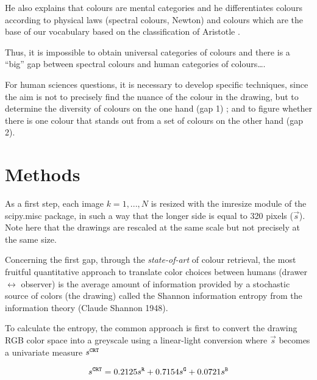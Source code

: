 \documentclass[11pt,a4paper]{article}
\begin{document}
He also explains that colours are mental categories
\cite[][p. 36]{pastoureau2017} and he differentiates colours according
to physical laws (spectral colours, Newton) and colours which are the
base of our vocabulary based on the classification of Aristotle
\cite[][p. 90-91]{pastoureau2017}.

Thus, it is impossible to obtain universal categories of colours and
there is a ``big'' gap between spectral colours and human categories of
colours\ldots{}.

For human sciences questions, it is necessary to develop specific
techniques, since the aim is not to precisely find the nuance of the
colour in the drawing, but to determine the diversity of colours on the
one hand (gap 1) ; and to figure whether there is one colour that stands
out from a set of colours on the other hand (gap 2).


\section{Methods}\label{methods}

As a first step, each image \(k=1,...,N\) is resized with the imresize
module of the scipy.misc package, in such a way that the longer side is
equal to 320 pixels (\(\vec{s}\)). Note here that the drawings are
rescaled at the same scale but not precisely at the same size.


Concerning the first gap, through the \emph{state-of-art} of colour
retrieval, the most fruitful quantitative approach to translate color
choices between humans (drawer \(\leftrightarrow\) observer) is the
average amount of information provided by a stochastic source of colors
(the drawing) called the Shannon information entropy from the
information theory (Claude Shannon 1948).

To calculate the entropy, the common approach is first to convert the
drawing RGB color space into a greyscale using a linear-light conversion
where \(\vec{s}\) becomes a univariate measure \(s^{\tt \tiny CRT}\)

\[s^{\tt \scriptstyle CRT} = 0.2125s^{\tt \scriptstyle R} + 0.7154 s^{\tt \scriptstyle G}+ 0.0721 s^{\tt \scriptstyle B}\]
\end{document}

